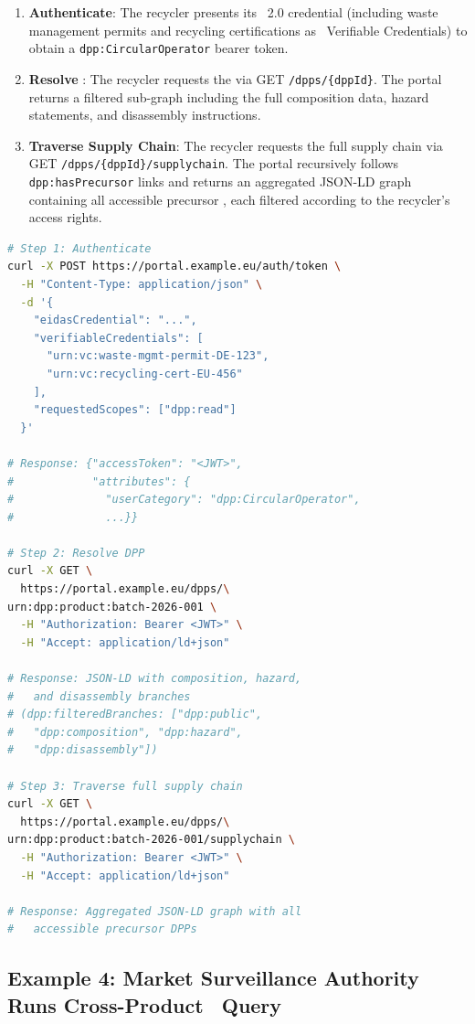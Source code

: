 \begin{enumerate}
\item \textbf{Authenticate}: The recycler presents its \eIDAS~2.0 credential
(including waste management permits and recycling certifications as \WthreeC\
Verifiable Credentials) to obtain a \texttt{dpp:CircularOperator} bearer token.
\item \textbf{Resolve \DPP}: The recycler requests the \DPP via GET
\texttt{/dpps/\{dppId\}}. The portal returns a filtered sub-graph including the
full composition data, hazard statements, and disassembly instructions.
\item \textbf{Traverse Supply Chain}: The recycler requests the full supply
chain via GET \texttt{/dpps/\{dppId\}/supplychain}. The portal recursively
follows \texttt{dpp:hasPrecursor} links and returns an aggregated JSON-LD graph
containing all accessible precursor \DPPs, each filtered according to the
recycler's access rights.
\end{enumerate}

\begin{lstlisting}[language=bash,breaklines=true,breakatwhitespace=true]
# Step 1: Authenticate
curl -X POST https://portal.example.eu/auth/token \
  -H "Content-Type: application/json" \
  -d '{
    "eidasCredential": "...",
    "verifiableCredentials": [
      "urn:vc:waste-mgmt-permit-DE-123",
      "urn:vc:recycling-cert-EU-456"
    ],
    "requestedScopes": ["dpp:read"]
  }'

# Response: {"accessToken": "<JWT>",
#            "attributes": {
#              "userCategory": "dpp:CircularOperator",
#              ...}}

# Step 2: Resolve DPP
curl -X GET \
  https://portal.example.eu/dpps/\
urn:dpp:product:batch-2026-001 \
  -H "Authorization: Bearer <JWT>" \
  -H "Accept: application/ld+json"

# Response: JSON-LD with composition, hazard,
#   and disassembly branches
# (dpp:filteredBranches: ["dpp:public",
#   "dpp:composition", "dpp:hazard",
#   "dpp:disassembly"])

# Step 3: Traverse full supply chain
curl -X GET \
  https://portal.example.eu/dpps/\
urn:dpp:product:batch-2026-001/supplychain \
  -H "Authorization: Bearer <JWT>" \
  -H "Accept: application/ld+json"

# Response: Aggregated JSON-LD graph with all
#   accessible precursor DPPs
\end{lstlisting}

\subsection{Example 4: Market Surveillance Authority Runs Cross-Product \SPARQL\
Query}

